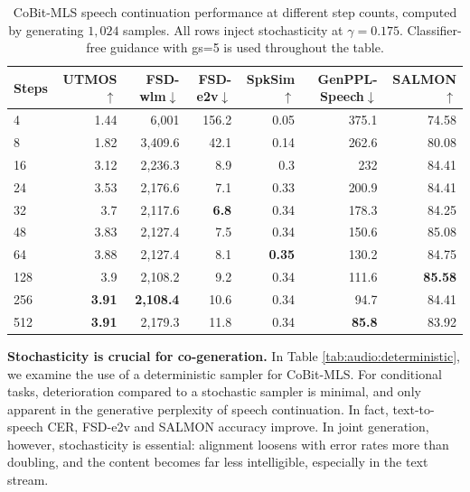 \begin{table}[t]
\centering
\small
\setlength{\tabcolsep}{4.5pt}
\begin{tabular}{lrrrrrr}
\toprule
\textbf{Steps} & \textbf{UTMOS}$\uparrow$ & \textbf{FSD-wlm}$\downarrow$ & \textbf{FSD-e2v}$\downarrow$ & \textbf{SpkSim}$\uparrow$ & \textbf{GenPPL-Speech}$\downarrow$ & \textbf{SALMON}$\uparrow$ \\
\midrule
4 & 1.44 & 6{,}001 & 156.2 & 0.05 & 375.1 & 74.58 \\
8 & 1.82 & 3{,}409.6 & 42.1 & 0.14 & 262.6 & 80.08 \\
16 & 3.12 & 2{,}236.3 & 8.9 & 0.3 & 232 & 84.41\\
24 & 3.53 & 2{,}176.6 & 7.1 & 0.33 & 200.9 & 84.41 \\
32 & 3.7 & 2{,}117.6 & \textbf{6.8} & 0.34 & 178.3 & 84.25 \\
48 & 3.83 & 2{,}127.4 & 7.5 & 0.34 & 150.6 & 85.08 \\
64 & 3.88 & 2{,}127.4 & 8.1 & \textbf{0.35} & 130.2 & 84.75 \\
128 & 3.9 & 2{,}108.2 & 9.2 & 0.34 & 111.6 & \textbf{85.58} \\
256 & \textbf{3.91} & \textbf{2{,}108.4} & 10.6 & 0.34 & 94.7 & 84.41 \\
512 & \textbf{3.91} & 2{,}179.3 & 11.8 & 0.34 & \textbf{85.8} & 83.92 \\
\bottomrule
\end{tabular}
\caption{CoBit-MLS speech continuation performance at different step counts, computed by generating $1,024$ samples. All rows inject stochasticity at $\gamma=0.175$. Classifier-free guidance with gs=5 is used throughout the table.}
\label{tab:audio:steps:continuation}
\end{table}

\textbf{Stochasticity is crucial for co-generation.} In Table \ref{tab:audio:deterministic}, we examine the use of a deterministic sampler for CoBit-MLS. For conditional tasks, deterioration compared to a stochastic sampler is minimal, and only apparent in the generative perplexity of speech continuation. In fact, text-to-speech CER, FSD-e2v and SALMON accuracy improve. In joint generation, however, stochasticity is essential: alignment loosens with error rates more than doubling, and the content becomes far less intelligible, especially in the text stream.

